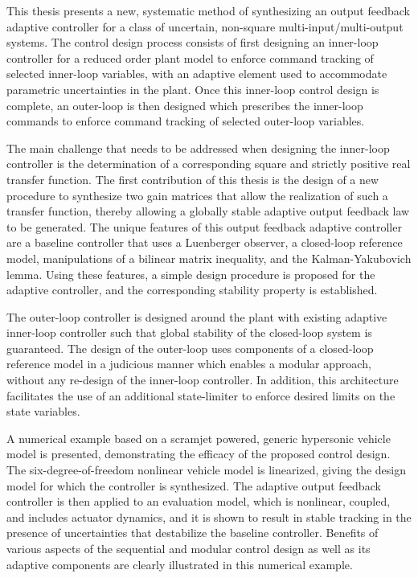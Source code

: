 This thesis presents a new, systematic method of synthesizing an output feedback adaptive controller for a class of uncertain, non-square multi-input/multi-output systems.
The control design process consists of first designing an inner-loop controller for a reduced order plant model to enforce command tracking of selected inner-loop variables, with an adaptive element used to accommodate parametric uncertainties in the plant.
Once this inner-loop control design is complete, an outer-loop is then designed which prescribes the inner-loop commands to enforce command tracking of selected outer-loop variables.

The main challenge that needs to be addressed when designing the inner-loop controller is the determination of a corresponding square and strictly positive real transfer function.
The first contribution of this thesis is the design of a new procedure to synthesize two gain matrices that allow the realization of such a transfer function, thereby allowing a globally stable adaptive output feedback law to be generated.
The unique features of this output feedback adaptive controller are a baseline controller that uses a Luenberger observer, a closed-loop reference model, manipulations of a bilinear matrix inequality, and the Kalman-Yakubovich lemma.
Using these features, a simple design procedure is proposed for the adaptive controller, and the corresponding stability property is established.

The outer-loop controller is designed around the plant with existing adaptive inner-loop controller such that global stability of the closed-loop system is guaranteed.
The design of the outer-loop uses components of a closed-loop reference model in a judicious manner which enables a modular approach, without any re-design of the inner-loop controller.
In addition, this architecture facilitates the use of an additional state-limiter to enforce desired limits on the state variables.

 A numerical example based on a scramjet powered, generic hypersonic vehicle model is presented, demonstrating the efficacy of the proposed control design.
 The six-degree-of-freedom nonlinear vehicle model is linearized, giving the design model for which the controller is synthesized.
 The adaptive output feedback controller is then applied to an evaluation model, which is nonlinear, coupled, and includes actuator dynamics, and it is shown to result in stable tracking in the presence of uncertainties that destabilize the baseline controller.
 Benefits of various aspects of the sequential and modular control design as well as its adaptive components are clearly illustrated in this numerical example.
